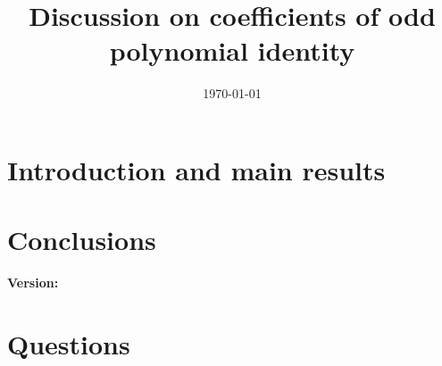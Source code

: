 \documentclass[12pt,letterpaper,oneside,reqno]{amsart}
\title[Discussion on coefficients of odd polynomial identity]
{Discussion on coefficients of odd polynomial identity}
\date{\today}
\begin{document}
    \begin{abstract}
        
    \end{abstract}

    \maketitle


    \section{Introduction and main results} \label{sec:introduction}
    

    \section{Conclusions}\label{sec:conclusions}
    

    
    
    \noindent \textbf{Version:} 

    \section{Questions}\label{sec:questions}
    
\end{document}

